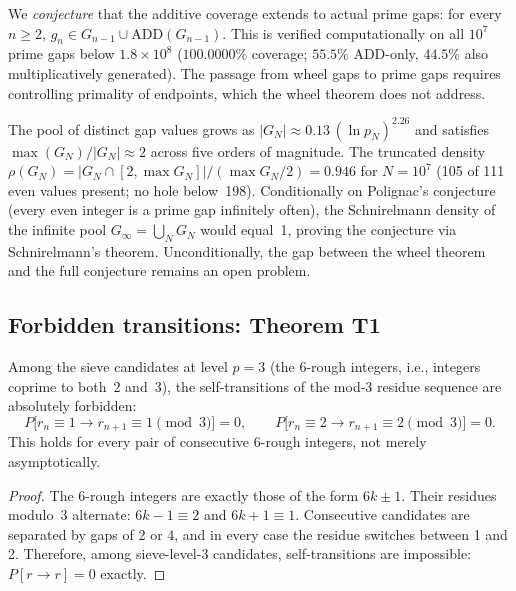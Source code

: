 \documentclass[12pt,a4paper]{article}
\begin{document}
\begin{remark}
\label{rem:coverage_conjecture}
We \emph{conjecture} that the additive coverage extends to actual
prime gaps: for every $n \geq 2$,
$g_n \in G_{n-1} \cup \mathrm{ADD}(G_{n-1})$.
This is verified computationally on all $10^7$ prime gaps below
$1.8 \times 10^8$ ($100.0000\%$ coverage; $55.5\%$ ADD-only,
$44.5\%$ also multiplicatively generated).
The passage from wheel gaps to prime gaps requires controlling
primality of endpoints, which the wheel theorem does not address.

The pool of distinct gap values grows as $|G_N| \approx 0.13\,
(\ln p_N)^{2.26}$ and satisfies $\max(G_N) / |G_N| \approx 2$
across five orders of magnitude.
The truncated density $\rho(G_N) = |G_N \cap [2, \max G_N]|
/ (\max G_N / 2) = 0.946$ for $N = 10^7$ (105 of 111 even
values present; no hole below~198).
Conditionally on Polignac's conjecture (every even integer is
a prime gap infinitely often), the Schnirelmann density of the
infinite pool $G_\infty = \bigcup_N G_N$ would equal~1,
proving the conjecture via Schnirelmann's theorem.
Unconditionally, the gap between the wheel theorem and the
full conjecture remains an open problem.
\end{remark}

\subsection{Forbidden transitions: Theorem T1}
\label{sec:T1}

\mTHM
\begin{theorem}
\label{thm:T1}
Among the sieve candidates at level $p = 3$ (the $6$-rough integers,
i.e., integers coprime to both~$2$ and~$3$), the self-transitions of
the mod-$3$ residue sequence are absolutely forbidden:
\begin{equation}
  P\bigl[r_n \equiv 1 \to r_{n+1} \equiv 1 \pmod{3}\bigr] = 0, \qquad
  P\bigl[r_n \equiv 2 \to r_{n+1} \equiv 2 \pmod{3}\bigr] = 0.
  \label{eq:T1}
\end{equation}
This holds for every pair of consecutive $6$-rough integers, not merely
asymptotically.
\end{theorem}

\begin{proof}
The $6$-rough integers are exactly those of the form $6k \pm 1$.
Their residues modulo~3 alternate: $6k - 1 \equiv 2$ and
$6k + 1 \equiv 1$. Consecutive candidates are separated by gaps
of 2 or 4, and in every case the residue switches between 1 and 2.
Therefore, among sieve-level-3 candidates, self-transitions are
impossible: $P[r \to r] = 0$ exactly.
\end{proof}
\end{document}

